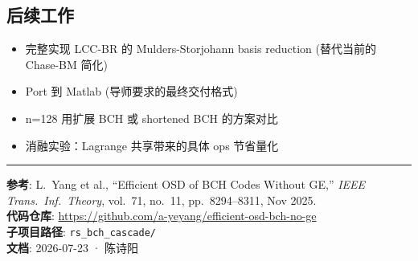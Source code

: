 \documentclass[11pt,a4paper]{article}
\begin{document}
\subsection{后续工作}

\begin{itemize}[leftmargin=1.5em]
\item 完整实现 LCC-BR 的 Mulders-Storjohann basis reduction (替代当前的 Chase-BM 简化)
\item Port 到 Matlab (导师要求的最终交付格式)
\item n=128 用扩展 BCH 或 shortened BCH 的方案对比
\item 消融实验：Lagrange 共享带来的具体 ops 节省量化
\end{itemize}

\vspace{6pt}
\hrule
\vspace{4pt}
\noindent\footnotesize{
\textbf{参考}: L.\ Yang et al., ``Efficient OSD of BCH Codes Without GE,''
{\it IEEE Trans.\ Inf.\ Theory}, vol.\ 71, no.\ 11, pp.\ 8294--8311, Nov 2025. \\
\textbf{代码仓库}: \url{https://github.com/a-yeyang/efficient-osd-bch-no-ge} \\
\textbf{子项目路径}: \texttt{rs\_bch\_cascade/} \\
\textbf{文档}: 2026-07-23 · 陈诗阳
}
\end{document}

